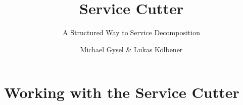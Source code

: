 \documentclass[hsr-ba,english]{hgbthesis}
\begin{document}

\bigskipamount=30pt

\title{Service Cutter}
\subtitle{A Structured Way toService Decomposition}
\author{Michael Gysel \& Lukas K\"{o}lbener}



\frontmatter
\maketitle
\setcounter{tocdepth}{1}
\tableofcontents

			

\mainmatter         %

\makeatletter
\renewcommand{\@makechapterhead}[1]{%
\vspace*{50 pt}%
{\setlength{\parindent}{0pt} \raggedright \normalfont
\bfseries\Huge\thechapter.\ #1
\par\nobreak\vspace{40 pt}}}
\makeatother











\chapter{Working with the Service Cutter}
\end{document}
